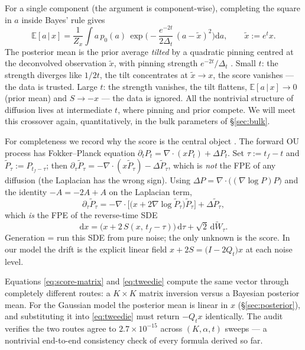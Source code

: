 \documentclass[11pt]{article}
\theoremstyle{definition}
\newcommand{\E}{\mathbb{E}}
\newcommand{\Dt}{\Delta_t}
\newcommand{\Qt}{Q_t}
\newcommand{\given}{\,|\,}
\newcommand{\dd}{\mathrm{d}}
\begin{document}
\begin{bayesianview}
For a single component (the argument is component-wise), completing the square
in $a$ inside Bayes' rule gives
\[
  \E[a\given x]=\frac1{Z_x}\int a\,p_0(a)\,
  \exp\!\Big(-\frac{e^{-2t}}{2\Dt}\,(a-\widetilde x)^2\Big)\dd a,
  \qquad \widetilde x:=e^{t}x .
\]
The posterior mean is the prior average \emph{tilted} by a quadratic pinning
centred at the deconvolved observation $\widetilde x$, with pinning strength
$e^{-2t}/\Dt$ \citep{song2021scorebased}. Small $t$: the strength diverges
like $1/2t$, the tilt concentrates at $\widetilde x\to x$, the score
vanishes --- the data is trusted. Large $t$: the strength vanishes, the tilt
flattens, $\E[a\given x]\to0$ (prior mean) and $S\to-x$ --- the data is
ignored. All the nontrivial structure of diffusion lives at intermediate $t$,
where pinning and prior compete. We will meet this crossover again,
quantitatively, in the bulk parameters of \S\ref{sec:bulk}.
\end{bayesianview}

\begin{derivation}
For completeness we record why the score is the central object
\citep{song2021scorebased}. The forward OU
process has Fokker--Planck equation
$\partial_tP_t=\nabla\!\cdot\!(xP_t)+\Delta P_t$. Set $\tau:=t_f-t$ and
$\widetilde P_\tau:=P_{t_f-\tau}$; then
$\partial_\tau\widetilde P_\tau=-\nabla\!\cdot\!(x\widetilde P_\tau)
-\Delta\widetilde P_\tau$, which is \emph{not} the FPE of any diffusion (the
Laplacian has the wrong sign). Using
$\Delta P=\nabla\!\cdot\!\big((\nabla\log P)P\big)$ and the identity
$-A=-2A+A$ on the Laplacian term,
\[
  \partial_\tau\widetilde P_\tau
  =-\nabla\!\cdot\!\Big[\big(x+2\nabla\log\widetilde P_\tau\big)
  \widetilde P_\tau\Big]+\Delta\widetilde P_\tau ,
\]
which \emph{is} the FPE of the reverse-time SDE
\[
  \dd x=\big(x+2\,S(x,\,t_f-\tau)\big)\,\dd\tau+\sqrt2\,\dd\widetilde W_\tau .
\]
Generation = run this SDE from pure noise; the only unknown is the score. In
our model the drift is the explicit linear field
$x+2S=\big(I-2\Qt\big)x$ at each noise level.
\end{derivation}

\begin{intuition}
Equations \eqref{eq:score-matrix} and \eqref{eq:tweedie} compute the same
vector through completely different routes: a $K\times K$ matrix inversion
versus a Bayesian posterior mean. For the Gaussian model the posterior mean is
linear in $x$ (\S\ref{sec:posterior}), and substituting it into
\eqref{eq:tweedie} must return $-\Qt x$ identically. The audit verifies the
two routes agree to $2.7\times10^{-15}$ across $(K,\alpha,t)$ sweeps ---
a nontrivial end-to-end consistency check of every formula derived so far.
\end{intuition}
\end{document}
